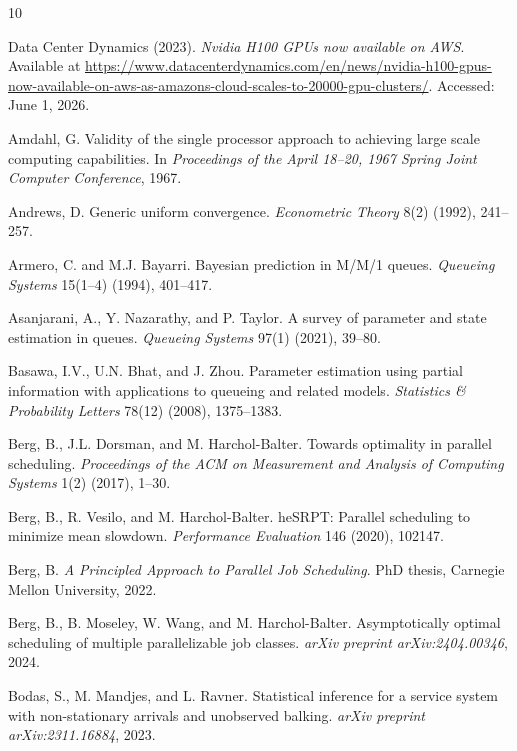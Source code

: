 \documentclass[11pt]{article}
\theoremstyle{remark}
\theoremstyle{definition}
\numberwithin{equation}{section}
\begin{document}
{\small \begin{thebibliography}{10}

Data Center Dynamics (2023).
\emph{Nvidia H100 GPUs now available on AWS}.
Available at {\small \url{https://www.datacenterdynamics.com/en/news/nvidia-h100-gpus-now-available-on-aws-as-amazons-cloud-scales-to-20000-gpu-clusters/}}.
Accessed: June 1, 2026.

Amdahl, G.
Validity of the single processor approach to achieving large scale computing capabilities.
In \textit{Proceedings of the April 18--20, 1967 Spring Joint Computer Conference}, 1967.

Andrews, D.
Generic uniform convergence.
\textit{Econometric Theory} 8(2) (1992), 241--257.

Armero, C. and M.J. Bayarri.
Bayesian prediction in M/M/1 queues.
\textit{Queueing Systems} 15(1--4) (1994), 401--417.

Asanjarani, A., Y. Nazarathy, and P. Taylor.
A survey of parameter and state estimation in queues.
\textit{Queueing Systems} 97(1) (2021), 39--80.

Basawa, I.V., U.N. Bhat, and J. Zhou.
Parameter estimation using partial information with applications to queueing and related models.
\textit{Statistics \& Probability Letters} 78(12) (2008), 1375--1383.

Berg, B., J.L. Dorsman, and M. Harchol-Balter.
Towards optimality in parallel scheduling.
\textit{Proceedings of the ACM on Measurement and Analysis of Computing Systems} 1(2) (2017), 1--30.


Berg, B., R. Vesilo, and M. Harchol-Balter.
heSRPT: Parallel scheduling to minimize mean slowdown.
\textit{Performance Evaluation} 146 (2020), 102147.

 Berg, B.
\textit{A Principled Approach to Parallel Job Scheduling}.
 PhD thesis, Carnegie Mellon University, 2022.

Berg, B., B. Moseley, W. Wang, and M. Harchol-Balter.
Asymptotically optimal scheduling of multiple parallelizable job classes.
\textit{arXiv preprint arXiv:2404.00346}, 2024.

Bodas, S., M. Mandjes, and L. Ravner.
Statistical inference for a service system with non-stationary arrivals and unobserved balking.
\textit{arXiv preprint arXiv:2311.16884}, 2023.


\end{thebibliography}}
\end{document}
